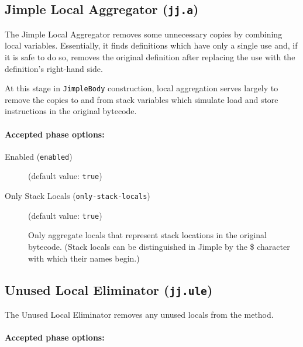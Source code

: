 \documentclass{article}
\begin{document}
\subsection{Jimple Local Aggregator ({\tt jj.a})}


\par

The Jimple Local Aggregator removes some unnecessary copies by
combining local variables. Essentially, it finds definitions
which have only a single use and, if it is safe to do so, removes
the original definition after replacing the use with the
definition's right-hand side.

\par

At this stage in {\tt JimpleBody} construction, local
aggregation serves largely to remove the copies to and from stack
variables which simulate load and store instructions in the
original bytecode.


\paragraph{Accepted phase options:} 

\begin{description}

\item[Enabled ({\tt enabled})]
(default value: {\tt true})






\item[Only Stack Locals ({\tt only-stack-locals})]
(default value: {\tt true})




Only aggregate locals that represent stack locations in the
original bytecode.  (Stack locals can be distinguished in Jimple
by the \$ character with which their names begin.)



\end{description}

\subsection{Unused Local Eliminator ({\tt jj.ule})}

The Unused Local Eliminator removes any unused locals from the
method.


\paragraph{Accepted phase options:} 
\end{document}
